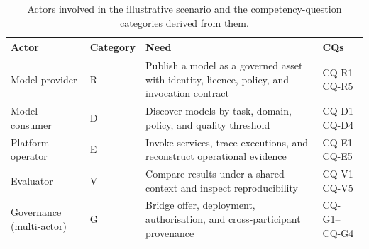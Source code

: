 \documentclass[Afour,sagev,times]{sagej}
\newcommand{\cq}[1]{\textsf{#1}}
\begin{document}
\begin{table}[t]
\small\sf\centering
\caption{Actors involved in the illustrative scenario and the competency-question categories derived from them.\label{tab:actors}}
\begin{tabular}{@{}p{3.5cm}p{2cm}p{7cm}p{2.5cm}@{}}
\toprule
\textbf{Actor} & \textbf{Category} & \textbf{Need} & \textbf{CQs} \\
\midrule
Model provider & R & Publish a model as a governed asset with identity, licence, policy, and invocation contract & \cq{CQ-R1}--\cq{CQ-R5} \\
Model consumer & D & Discover models by task, domain, policy, and quality threshold & \cq{CQ-D1}--\cq{CQ-D4} \\
Platform operator & E & Invoke services, trace executions, and reconstruct operational evidence & \cq{CQ-E1}--\cq{CQ-E5} \\
Evaluator & V & Compare results under a shared context and inspect reproducibility & \cq{CQ-V1}--\cq{CQ-V5} \\
Governance (multi-actor) & G & Bridge offer, deployment, authorisation, and cross-participant provenance & \cq{CQ-G1}--\cq{CQ-G4} \\
\bottomrule
\end{tabular}
\end{table}
\end{document}
